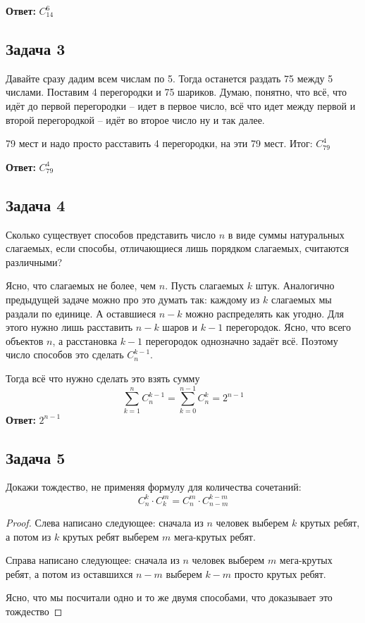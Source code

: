 \textbf{Ответ:} $C^6_{14}$

\subsection{Задача 3}

Давайте сразу дадим всем числам по 5. Тогда останется раздать 75 между 5 числами. Поставим 4 перегородки и 75 шариков. Думаю, понятно, что всё, что идёт до первой перегородки -- идет в первое число, всё что идет между первой и второй перегородкой -- идёт во второе число ну и так далее.

79 мест и надо просто расставить 4 перегородки, на эти 79 мест. Итог: $C^4_{79}$

\textbf{Ответ:} $C^4_{79}$

\subsection{Задача 4}

Сколько существует способов представить число $n$ в виде суммы натуральных слагаемых, если способы, отличающиеся лишь порядком слагаемых, считаются различными?

Ясно, что слагаемых не более, чем $n$. Пусть слагаемых $k$ штук. Аналогично предыдущей задаче можно про это думать так: каждому из $k$ слагаемых мы раздали по единице. А оставшиеся $n - k$ можно распределять как угодно. Для этого нужно лишь расставить $n - k$ шаров и $k - 1$ перегородок. Ясно, что всего объектов $n$, а расстановка $k - 1$ перегородок однозначно задаёт всё. Поэтому число способов это сделать $C^{k-1}_{n}$.

Тогда всё что нужно сделать это взять сумму
\[
\sum_{k=1}^{n} C^{k-1}_{n} = \sum_{k=0}^{n-1} C^{k}_{n} = 2^{n-1}
\]
\textbf{Ответ:} $2^{n-1}$

\subsection{Задача 5}

Докажи тождество, не применяя формулу для количества сочетаний:
\[
C^k_n\cdot C^m_k = C^m_n \cdot C^{k-m}_{n-m}
\]

\begin{proof}
Слева написано следующее: сначала из $n$ человек выберем $k$ крутых ребят, а потом из $k$ крутых ребят выберем $m$ мега-крутых ребят.

Справа написано следующее: сначала из $n$ человек выберем $m$ мега-крутых ребят, а потом из оставшихся $n - m$ выберем $k- m$ просто крутых ребят. 

Ясно, что мы посчитали одно и то же двумя способами, что доказывает это тождество
\end{proof}

